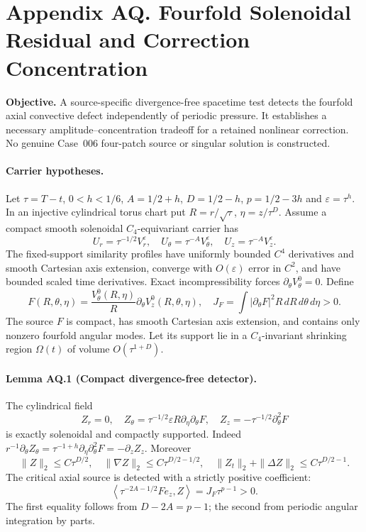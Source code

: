 \clearpage
\section*{Appendix AQ. Fourfold Solenoidal Residual and Correction Concentration}
\noindent\textbf{Objective.} A source-specific divergence-free spacetime test detects the fourfold axial convective defect independently of periodic pressure. It establishes a necessary amplitude--concentration tradeoff for a retained nonlinear correction. No genuine Case~006 four-patch source or singular solution is constructed.

\paragraph{Carrier hypotheses.}
Let $\tau=T-t$, $0<h<1/6$, $A=1/2+h$, $D=1/2-h$, $p=1/2-3h$ and $\varepsilon=\tau^h$. In an injective cylindrical torus chart put $R=r/\sqrt\tau$, $\eta=z/\tau^D$. Assume a compact smooth solenoidal $C_4$-equivariant carrier has
\[
U_r=\tau^{-1/2}V_r^\varepsilon,\quad
U_\theta=\tau^{-A}V_\theta^\varepsilon,\quad
U_z=\tau^{-A}V_z^\varepsilon.
\]
The fixed-support similarity profiles have uniformly bounded $C^4$ derivatives and smooth Cartesian axis extension, converge with $O(\varepsilon)$ error in $C^2$, and have bounded scaled time derivatives. Exact incompressibility forces $\partial_\theta V_\theta^0=0$. Define
\[
F(R,\theta,\eta)=\frac{V_\theta^0(R,\eta)}R\partial_\theta V_z^0(R,\theta,\eta),
\quad
J_F=\int |\partial_\theta F|^2 R\,dR\,d\theta\,d\eta>0.
\]
The source $F$ is compact, has smooth Cartesian axis extension, and contains only nonzero fourfold angular modes. Let its support lie in a $C_4$-invariant shrinking region $\Omega(t)$ of volume $O(\tau^{1+D})$.

\paragraph{Lemma AQ.1 (Compact divergence-free detector).}
The cylindrical field
\[
\boxed{
Z_r=0,\quad
Z_\theta=\tau^{-1/2}\varepsilon R\partial_\eta\partial_\theta F,\quad
Z_z=-\tau^{-1/2}\partial_\theta^2F
}
\]
is exactly solenoidal and compactly supported. Indeed
$r^{-1}\partial_\theta Z_\theta
=\tau^{-1+h}\partial_\eta\partial_\theta^2F
=-\partial_zZ_z$. Moreover
\[
\|Z\|_2\le C\tau^{D/2},\quad
\|\nabla Z\|_2\le C\tau^{D/2-1/2},\quad
\|Z_t\|_2+\|\Delta Z\|_2\le C\tau^{D/2-1}.
\]
The critical axial source is detected with a strictly positive coefficient:
\[
\boxed{
\left\langle\tau^{-2A-1/2}F e_z,Z\right\rangle
=J_F\tau^{p-1}>0.
}
\]
The first equality follows from $D-2A=p-1$; the second from periodic angular integration by parts.

